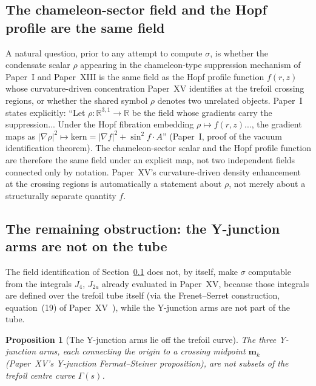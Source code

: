 \documentclass[11pt,a4paper]{article}
\newtheorem{proposition}[theorem]{Proposition}
\theoremstyle{definition}\newtheorem{definition}[theorem]{Definition}
\theoremstyle{remark}
\theoremstyle{definition}\newtheorem{construction}[theorem]{Construction}
\begin{document}
\subsection{The chameleon-sector field and the Hopf profile are the
  same field}
\label{P16:sec:field_identification}

A natural question, prior to any attempt to compute $\sigma$, is
whether the condensate scalar $\rho$ appearing in the chameleon-type
suppression mechanism of Paper~I and Paper~XIII is the same field as
the Hopf profile function $f(r,z)$ whose curvature-driven
concentration Paper~XV identifies at the trefoil crossing regions, or
whether the shared symbol $\rho$ denotes two unrelated objects. Paper~I
states explicitly: ``Let $\rho:\mathbb{R}^{3,1}\to\mathbb{R}$ be the
field whose gradients carry the suppression... Under the Hopf fibration
embedding $\rho\mapsto f(r,z)$..., the gradient maps as $|\nabla\rho|^2\mapsto
\mathrm{kern}=|\nabla f|^2+\sin^2\!f\cdot A$'' (Paper~I, proof of the
vacuum identification theorem). The chameleon-sector scalar and the
Hopf profile function are therefore the same field under an explicit
map, not two independent fields connected only by notation. Paper~XV's
curvature-driven density enhancement at the crossing regions is automatically
a statement about $\rho$, not merely about a structurally separate quantity $f$.

\subsection{The remaining obstruction: the Y-junction arms are not on
  the tube}
\label{P16:sec:geometric_obstruction}

The field identification of
Section~\ref{P16:sec:field_identification} does not, by itself, make
$\sigma$ computable from the integrals $J_4$, $J_{2a}$ already
evaluated in Paper~XV, because those integrals are defined over the
trefoil tube itself (via the Frenet--Serret construction,
equation~(19) of Paper~XV~\cite{Paper15}), while the Y-junction arms are not part of the
tube.

\begin{proposition}[The Y-junction arms lie off the trefoil curve]
\label{P16:prop:arms_off_curve}
The three Y-junction arms, each connecting the origin to a crossing
midpoint $\mathbf{m}_k$ (Paper~XV's Y-junction Fermat--Steiner
proposition), are not subsets of the trefoil centre curve $\Gamma(s)$.
\end{proposition}
\end{document}
